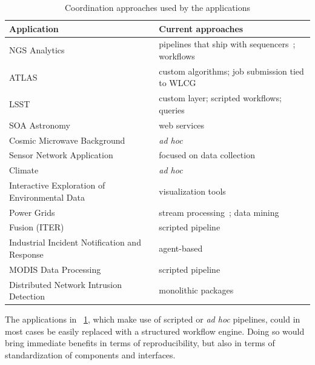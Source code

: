 \begin{table}
  \begin{scriptsize}
    \begin{center}
      \caption{Coordination approaches used by the applications\label{table:progSystems}}
      \begin{tabular}{|p{6.3cm}|p{7.2cm}|}
        \hline Application  & Current approaches \\
        \hline
        \hline NGS Analytics & pipelines that ship with
        sequencers~\cite{illumina}; workflows~\cite{Taverna} \\
        \hline ATLAS & custom algorithms; job submission tied to WLCG \\
        \hline LSST & custom layer; scripted workflows; queries \\
        \hline SOA Astronomy & web services~\cite{barker} \\
        \hline Cosmic Microwave Background & \textit{ad hoc} \\
        \hline Sensor Network Application & focused on data collection \\
        \hline Climate & \textit{ad hoc} \\
        \hline Interactive Exploration of Environmental Data &
        visualization tools~\cite{blower2} \\
        \hline Power Grids & stream processing~\cite{Simmhan:sciencecloud:2011}; data mining~\cite{Yin:mapreduce:2012} \\
        \hline Fusion (ITER) & scripted pipeline~\cite{adios} \\
        \hline Industrial Incident Notification and Response &
        agent-based~\cite{emergency4}  \\
        \hline MODIS Data Processing & scripted pipeline~\cite{modis:ipdps:2010} \\
        \hline Distributed Network Intrusion Detection & monolithic
        packages \\
        \hline
      \end{tabular}
    \end{center}
  \end{scriptsize}
\end{table}


The applications in \tablename~\ref{table:progSystems}, which make use
of scripted or \textit{ad hoc} pipelines, could in most cases be easily
replaced with a structured workflow engine. Doing so would bring
immediate benefits in terms of reproducibility, but also in terms of
standardization of components and interfaces.

